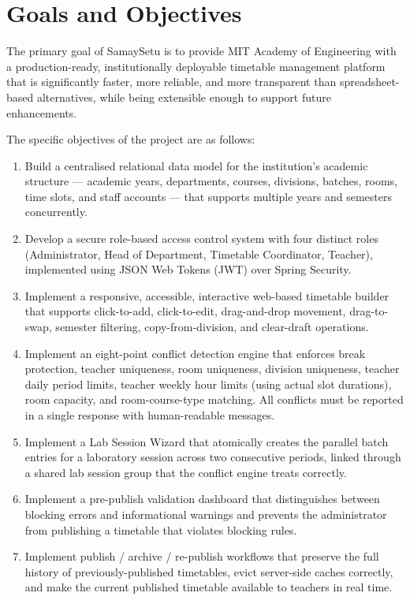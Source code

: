 \section{Goals and Objectives}

The primary goal of SamaySetu is to provide MIT Academy of Engineering with a production-ready, institutionally deployable timetable management platform that is significantly faster, more reliable, and more transparent than spreadsheet-based alternatives, while being extensible enough to support future enhancements.

The specific objectives of the project are as follows:

\begin{enumerate}
    \item Build a centralised relational data model for the institution's academic structure --- academic years, departments, courses, divisions, batches, rooms, time slots, and staff accounts --- that supports multiple years and semesters concurrently.
    \item Develop a secure role-based access control system with four distinct roles (Administrator, Head of Department, Timetable Coordinator, Teacher), implemented using JSON Web Tokens (JWT) over Spring Security.
    \item Implement a responsive, accessible, interactive web-based timetable builder that supports click-to-add, click-to-edit, drag-and-drop movement, drag-to-swap, semester filtering, copy-from-division, and clear-draft operations.
    \item Implement an eight-point conflict detection engine that enforces break protection, teacher uniqueness, room uniqueness, division uniqueness, teacher daily period limits, teacher weekly hour limits (using actual slot durations), room capacity, and room-course-type matching. All conflicts must be reported in a single response with human-readable messages.
    \item Implement a Lab Session Wizard that atomically creates the parallel batch entries for a laboratory session across two consecutive periods, linked through a shared lab session group that the conflict engine treats correctly.
    \item Implement a pre-publish validation dashboard that distinguishes between blocking errors and informational warnings and prevents the administrator from publishing a timetable that violates blocking rules.
    \item Implement publish / archive / re-publish workflows that preserve the full history of previously-published timetables, evict server-side caches correctly, and make the current published timetable available to teachers in real time.

\end{enumerate}
